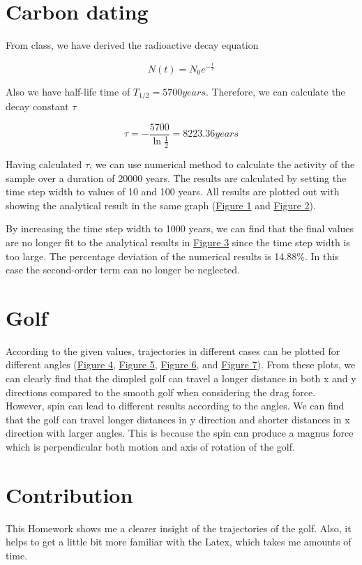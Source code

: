 \documentclass[11pt, oneside]{article}
\begin{document}
\section{Carbon dating}
From class, we have derived the radioactive decay equation

\begin{equation}
    N(t) = N_0 e^{-\frac{t}{\tau}}
\end{equation}

Also we have half-life time of \(T_{1/2} = 5700years\). Therefore, we can calculate the decay constant $\tau$

\begin{equation}
    \tau = -\frac{5700}{\ln{\frac{1}{2}}} = 8223.36years
\end{equation}

Having calculated $\tau$, we can use numerical method to calculate the activity of the sample over a duration of 20000 years. The results are calculated by setting the time step width to values of 10 and 100 years. All results are plotted out with showing the analytical result in the same graph (\hyperref[fig:1]{Figure 1} and \hyperref[fig:2]{Figure 2}).

By increasing the time step width to 1000 years, we can find that the final values are no longer fit to the analytical results in \hyperref[fig:3]{Figure 3} since the time step width is too large. The percentage deviation of the numerical results is 14.88\%. In this case the second-order term can no longer be neglected.

\section{Golf}

According to the given values, trajectories in different cases can be plotted for different angles (\hyperref[fig:4]{Figure 4}, \hyperref[fig:5]{Figure 5}, \hyperref[fig:6]{Figure 6}, and \hyperref[fig:7]{Figure 7}). From these plots, we can clearly find that the dimpled golf can travel a longer distance in both x and y directions compared to the smooth golf when considering the drag force. However, spin can lead to different results according to the angles. We can find that the golf can travel longer distances in y direction and shorter distances in x direction with larger angles. This is because the spin can produce a magnus force which is perpendicular both motion and axis of rotation of the golf.

\section{Contribution}

This Homework shows me a clearer insight of the trajectories of the golf. Also, it helps to get a little bit more familiar with the Latex, which takes me amounts of time.
\end{document}
